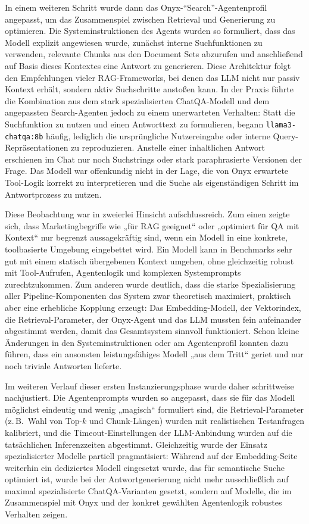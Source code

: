 In einem weiteren Schritt wurde dann das Onyx-\enquote{Search}-Agentenprofil angepasst, um das Zusammenspiel zwischen Retrieval und Generierung zu optimieren.
Die Systeminstruktionen des Agents wurden so formuliert, dass das Modell explizit angewiesen wurde, zunächst interne Suchfunktionen zu verwenden, relevante Chunks aus den Document Sets abzurufen und anschließend auf Basis dieses Kontextes eine Antwort zu generieren.
Diese Architektur folgt den Empfehlungen vieler RAG-Frameworks, bei denen das LLM nicht nur passiv Kontext erhält, sondern aktiv Suchschritte anstoßen kann.
In der Praxis führte die Kombination aus dem stark spezialisierten ChatQA-Modell und dem angepassten Search-Agenten jedoch zu einem unerwarteten Verhalten:
Statt die Suchfunktion zu nutzen und einen Antworttext zu formulieren, begann \texttt{llama3-chatqa:8b} häufig, lediglich die ursprüngliche Nutzereingabe oder interne Query-Repräsentationen zu reproduzieren.
Anstelle einer inhaltlichen Antwort erschienen im Chat nur noch Suchstrings oder stark paraphrasierte Versionen der Frage.
Das Modell war offenkundig nicht in der Lage, die von Onyx erwartete Tool-Logik korrekt zu interpretieren und die Suche als eigenständigen Schritt im Antwortprozess zu nutzen.

Diese Beobachtung war in zweierlei Hinsicht aufschlussreich.
Zum einen zeigte sich, dass Marketingbegriffe wie „für RAG geeignet“ oder „optimiert für QA mit Kontext“ nur begrenzt aussagekräftig sind, wenn ein Modell in eine konkrete, toolbasierte Umgebung eingebettet wird.
Ein Modell kann in Benchmarks sehr gut mit einem statisch übergebenen Kontext umgehen, ohne gleichzeitig robust mit Tool-Aufrufen, Agentenlogik und komplexen Systemprompts zurechtzukommen.
Zum anderen wurde deutlich, dass die starke Spezialisierung aller Pipeline-Komponenten das System zwar theoretisch maximiert, praktisch aber eine erhebliche Kopplung erzeugt:
Das Embedding-Modell, der Vektorindex, die Retrieval-Parameter, der Onyx-Agent und das LLM mussten fein aufeinander abgestimmt werden, damit das Gesamtsystem sinnvoll funktioniert.
Schon kleine Änderungen in den Systeminstruktionen oder am Agentenprofil konnten dazu führen, dass ein ansonsten leistungsfähiges Modell „aus dem Tritt“ geriet und nur noch triviale Antworten lieferte.

Im weiteren Verlauf dieser ersten Instanzierungsphase wurde daher schrittweise nachjustiert.
Die Agentenprompts wurden so angepasst, dass sie für das Modell möglichst eindeutig und wenig „magisch“ formuliert sind, die Retrieval-Parameter (z.\,B.\ Wahl von Top-$k$ und Chunk-Längen) wurden mit realistischen Testanfragen kalibriert, und die Timeout-Einstellungen der LLM-Anbindung wurden auf die tatsächlichen Inferenzzeiten abgestimmt.
Gleichzeitig wurde der Einsatz spezialisierter Modelle partiell pragmatisiert:
Während auf der Embedding-Seite weiterhin ein dediziertes Modell eingesetzt wurde, das für semantische Suche optimiert ist, wurde bei der Antwortgenerierung nicht mehr ausschließlich auf maximal spezialisierte ChatQA-Varianten gesetzt, sondern auf Modelle, die im Zusammenspiel mit Onyx und der konkret gewählten Agentenlogik robustes Verhalten zeigen.

